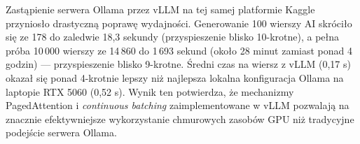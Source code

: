Zastąpienie serwera Ollama przez vLLM na tej samej platformie Kaggle przyniosło drastyczną poprawę wydajności. Generowanie 100 wierszy AI skróciło się ze 178 do zaledwie 18,3 sekundy (przyspieszenie blisko 10-krotne), a pełna próba 10\,000 wierszy ze 14\,860 do 1\,693 sekund (około 28 minut zamiast ponad 4 godzin) --- przyspieszenie blisko 9-krotne. Średni czas na wiersz z vLLM (0,17 s) okazał się ponad 4-krotnie lepszy niż najlepsza lokalna konfiguracja Ollama na laptopie RTX 5060 (0,52 s). Wynik ten potwierdza, że mechanizmy PagedAttention i \textit{continuous batching} zaimplementowane w vLLM pozwalają na znacznie efektywniejsze wykorzystanie chmurowych zasobów GPU niż tradycyjne podejście serwera Ollama.

